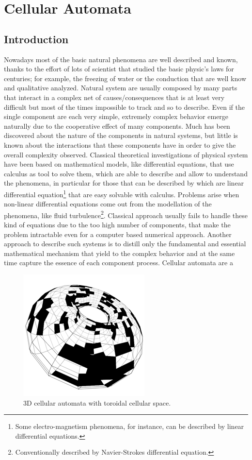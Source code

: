 
\chapter{Cellular Automata}

\section{Introduction}\label{cellularAutomataIntroduction}
Nowadays most of the basic natural phenomena are well described and known,
thanks to the effort of lots of scientist that studied the basic physic's laws for
centuries; for example, the freezing of water or the conduction that are well
know and qualitative analyzed. Natural system are usually composed by
many parts that interact in a complex net of causes/consequences that is at
least very difficult but most of the times impossible to track and so to
describe. Even if the single component are each very simple,
extremely complex behavior emerge naturally due to the cooperative effect of
many components. Much has been discovered about the nature of the components in
natural systems, but little is known about the interactions that these
components have in order to give the overall complexity observed.
Classical theoretical investigations of physical system have been based on
mathematical models, like differential equations, that use calculus as tool
to solve them, which are able to describe and allow to understand the
phenomena, in particular for those that can be described by which are linear
differential equation\footnote{Some electro-magnetism phenomena, for instance,
can be described by linear differential equations.} that are easy solvable with calculus.
Problems arise when non-linear differential equations come out from the
modellation of the phenomena, like fluid turbulence\footnote{Conventionally
described by Navier-Strokes differential equation.}.
Classical approach usually fails to handle these kind of equations due to the
too high number of components, that make the problem intractable even for a computer based numerical approach.
Another approach to describe such systems is to distill only the fundamental and
essential mathematical mechanism that yield to the complex behavior and at  the
same time capture the essence of each component process. Cellular automata are a
\begin{figure}
\includegraphics[scale=0.9]{./images/torus-2}
\caption{3D cellular automata with toroidal cellular space.}\label{torus}
\end{figure}
